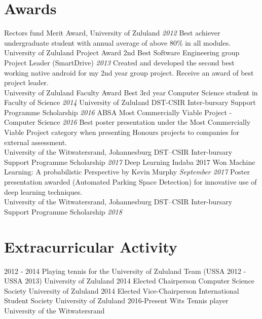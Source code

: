 \documentclass[letterpaper]{moderncv}        %
\begin{document}
				\section{Awards}
				\cventry
				{Rector\textquotesingle{}s fund}
				{Merit Award, University of Zululand}
				{}
				{\textit{2012}}
				{}
				{Best achiever undergraduate student with annual average of above 80\% in all modules.\\University of Zululand}
				\vspace{1mm}
				\cventry
				{Project Award}
				{2nd Best Software Engineering group Project Leader (SmartDrive)}
				{}
				{\textit{2013}}
				{}
				{Created and developed the second best working native android for my 2nd year group project. Receive an award of best project leader.\\University of Zululand}
				\vspace{1mm}
				\cventry
				{Faculty Award}
				{Best 3rd year Computer Science student in Faculty of Science}
				{}
				{\textit{2014}}
				{}
				{University of Zululand}
				\vspace{1mm}
				\cventry
				{DST-CSIR}
				{Inter-bursary Support Programme Scholarship}
				{}
				{\textit{2016}}
				{}
				{}
				\vspace{1mm}
				\cventry
				{ABSA}
				{Most Commercially Viable Project - Computer Science}
				{}
				{\textit{2016}}
				{}
				{Best poster presentation under the Most Commercially Viable Project category when presenting Honours projects to companies for external assessment.\\University of the Witwatersrand, Johannesburg}
				\vspace{1mm}
				\cventry
				{DST–CSIR}
				{Inter-bursary Support Programme Scholarship}
				{}
				{\textit{2017}}
				{}
				{}
				\vspace{1mm}
				\cventry
				{Deep Learning Indaba 2017}
				{Won \textquotesingle{}Machine Learning: A probabilistic Perspective by Kevin Murphy\textquotesingle{}}
				{}
				{\textit{September 2017}}
				{}
				{Poster presentation awarded (Automated Parking Space Detection) for innovative use of deep learning techniques.\\University of the Witwatersrand, Johannesburg}
				\vspace{1mm}
				\cventry
				{DST–CSIR}
				{Inter-bursary Support Programme Scholarship}
				{}
				{\textit{2018}}
				{}
				{}
				\vspace{1mm}
				
\section{Extracurricular Activity}
\cventry
{2012 - 2014}
{Playing tennis for the University of Zululand Team (USSA 2012 - USSA 2013)}
{University of Zululand}
{}
{\textit{}}
{}
\cventry
{2014}
{Elected Chairperson Computer Science Society}
{University of Zululand}
{}
{\textit{}}
{}
\cventry
{2014}
{Elected Vice-Chairperson International Student Society}
{University of Zululand}
{}
{\textit{}}
{}	
\cventry
{2016-Present}
{Wits Tennis player}
{University of the Witwatersrand}
{}
{\textit{}}
{}
\end{document}
